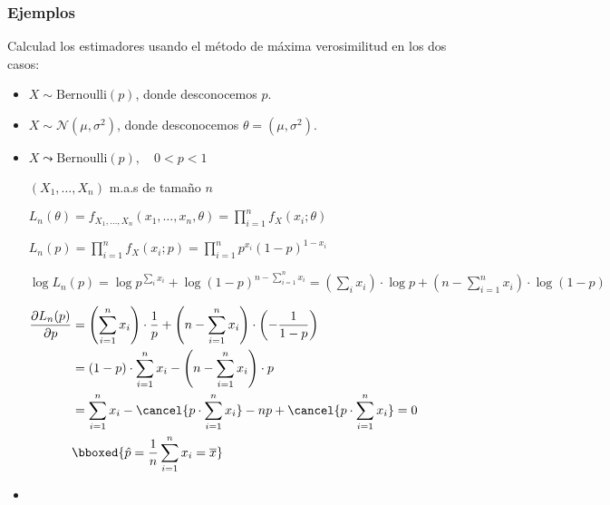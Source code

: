 \subsubsection*{Ejemplos}
\begin{tcolorbox}[colback=red!5!white, colframe=red!75!black, title=\textbf{Ejemplos de estimación por máxima verosimilitud}]
Calculad los estimadores usando el método de máxima verosimilitud en los dos casos:
\begin{itemize}[label=\textbullet]
    \item $X\sim \mathrm{Bernoulli}(p)$, donde desconocemos $p$.
    \item $X\sim \mathcal{N}(\mu,\sigma^2)$, donde desconocemos $\theta=(\mu,\sigma^2)$.
\end{itemize}
\end{tcolorbox}
\begin{itemize}[label=\color{red}\textbullet, leftmargin=*]
    \item {}

        $X\leadsto \mathrm{Bernoulli}(p),\quad 0<p<1$ 

        $(X_1,\dots,X_n)$ m.a.s de tamaño $n$

         $L_n(\theta)=f_{X_1,\dots,X_n}(x_1,\dots,x_n,\theta)=\prod_{i=1}^{n} f_X(x_i;\theta) $ 

         $L_n(p)=\prod_{i=1}^{n} f_X(x_i;p)=\prod_{i=1}^{n} p^{x_i}(1-p)^{1-x_i}$

         $\log L_n(p)=\log p^{\sum_i x_i}+\log(1-p)^{n-\sum_{i=1}^{n} x_i}=\left( \sum_i x_i \right) \cdot \log p+\left( n-\sum_{i=1}^{n} x_i \right) \cdot \log(1-p)$

         $\begin{aligned}
             \frac{\partial L_n(p)}{\partial p} &=\left( \sum_{i=1}^{n} x_i \right) \cdot \dfrac{1}{p}+\left( n-\sum_{i=1}^{n} x_i \right) \cdot \left( -\dfrac{1}{1-p} \right) \\
             &= (1-p)\cdot \sum_{i=1}^{n} x_i-\left( n-\sum_{i=1}^{n} x_i \right) \cdot p\\
             &= \sum_{i=1}^{n} x_i-\cancel{p \cdot \sum_{i=1}^{n} x_i}-np+\cancel{p\cdot \sum_{i=1}^{n} x_i}=0   \\
             & \bboxed{\hat{p}=\dfrac{1}{n}\sum_{i=1}^{n} x_i=\overline{x}} 
         \end{aligned}
         $
\item {}


\end{itemize}
